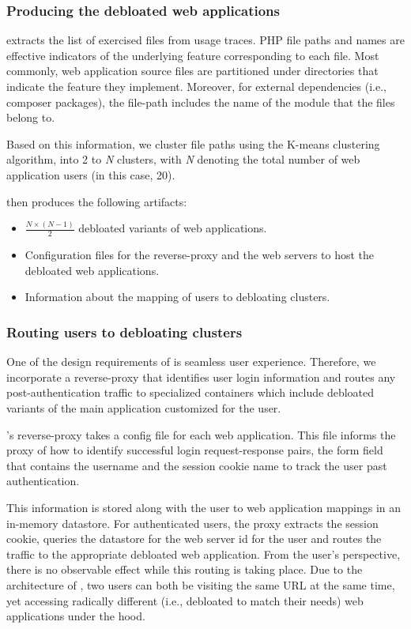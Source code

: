 \subsubsection{Producing the debloated web applications}

\dbltr{} extracts the list of exercised files from usage traces. 
PHP file paths and names are effective indicators of the underlying feature corresponding to each file. 
Most commonly, web application source files are partitioned under directories that indicate the feature they implement. 
Moreover, for external dependencies (i.e., composer packages), the file-path includes the name of the module that the files belong to. 

Based on this information, we cluster file paths using the K-means clustering algorithm, into 2 to \emph{N} clusters, with \emph{N} denoting the total number of web application users (in this case, 20).  

\dbltr{} then produces the following artifacts:
\begin{itemize}
    \item \( \frac{N \times (N - 1)}{2} \) debloated variants of web applications.
    \item Configuration files for the reverse-proxy and the web servers to host the debloated web applications.
    \item Information about the mapping of users to debloating clusters.
\end{itemize}

\subsubsection{Routing users to debloating clusters}

One of the design requirements of \dbltr{} is seamless user experience. 
Therefore, we incorporate a reverse-proxy that identifies user login information and routes any post-authentication traffic to specialized containers which include debloated variants of the main application customized for the user. 

\dbltr{}'s reverse-proxy takes a config file for each web application. 
This file informs the proxy of how to identify successful login request-response pairs, the form field that contains the username and the session cookie name to track the user past authentication. 

This information is stored along with the user to web application mappings in an in-memory datastore. 
For authenticated users, the proxy extracts the session cookie, queries the datastore for the web server id for the user and routes the traffic to the appropriate debloated web application. 
From the user's perspective, there is no observable effect while this routing is taking place. Due to the architecture of \dbltr{}, two users can both be visiting the same URL at the same time, yet accessing radically different (i.e., debloated to match their needs) web applications under the hood. 

